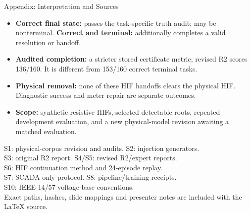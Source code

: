 \documentclass{beamer}
\begin{document}
\begin{frame}{Appendix: Interpretation and Sources}
  \small
  \begin{itemize}
    \setlength\itemsep{0.55em}
    \item \textbf{Correct final state:} passes the task-specific truth audit; may be nonterminal. \textbf{Correct and terminal:} additionally completes a valid resolution or handoff.
    \item \textbf{Audited completion:} a stricter stored certificate metric; revised R2 scores 136/160. It is different from 153/160 correct terminal tasks.
    \item \textbf{Physical removal:} none of these HIF handoffs clears the physical HIF. Diagnostic success and meter repair are separate outcomes.
    \item \textbf{Scope:} synthetic resistive HIFs, selected detectable roots, repeated development evaluation, and a new physical-model revision awaiting a matched evaluation.
  \end{itemize}
  \vspace{0.5em}
  \footnotesize
  S1: physical-corpus revision and audits. S2: injection generators.\\
  S3: original R2 report. S4/S5: revised R2/expert reports.\\
  S6: HIF continuation method and 24-episode replay.\\
  S7: SCADA-only protocol. S8: pipeline/training receipts.\\
  S10: IEEE-14/57 voltage-base conventions.\\[0.4em]
  Exact paths, hashes, slide mappings and presenter notes are included with the LaTeX source.
\end{frame}
\end{document}
